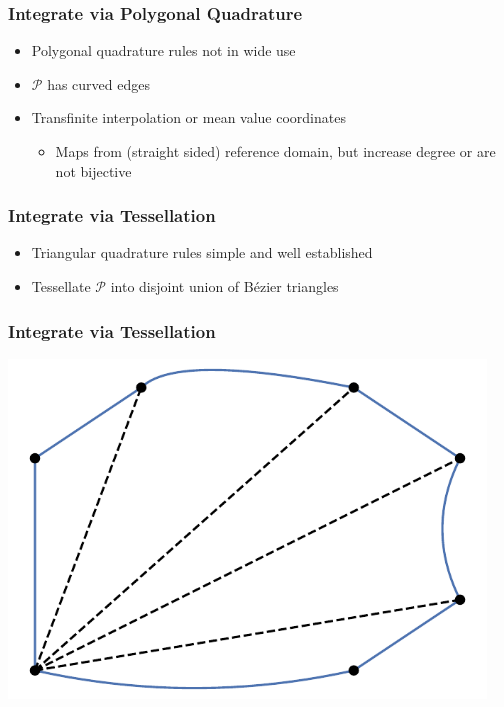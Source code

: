 \documentclass{beamer}
\begin{document}
\begin{frame}
\frametitle{Integrate via Polygonal Quadrature}
\begin{itemize}
\item Polygonal quadrature rules not in wide use
\pause
\item \(\mathcal{P}\) has curved edges
\pause
\item Transfinite interpolation or mean value coordinates
\begin{itemize}
\pause
\item Maps from (straight sided) reference domain, but increase degree or
  are not bijective
\end{itemize}
\end{itemize}
\end{frame}

\begin{frame}
\frametitle{Integrate via Tessellation}
\begin{itemize}
\item Triangular quadrature rules simple and well established
\pause
\item Tessellate \(\mathcal{P}\) into disjoint union of B\'{e}zier triangles
\end{itemize}
\end{frame}

\begin{frame}
\frametitle{Integrate via Tessellation}
\begin{center}
\includegraphics[width=0.95\textwidth]
                {../images/solution-transfer/main_figure11.pdf}
\end{center}
\end{frame}
\end{document}
